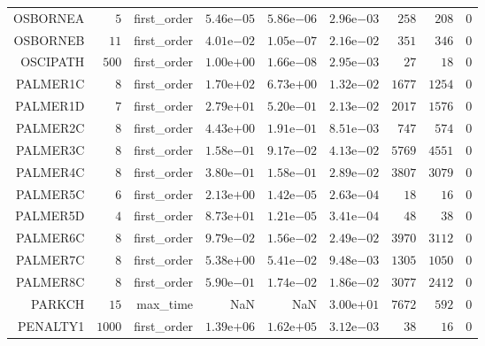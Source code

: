 \begin{longtable}{rrrrrrrrr}
OSBORNEA & \(     5\) & first\_order & \( 5.46\)e\(-05\) & \( 5.86\)e\(-06\) & \( 2.96\)e\(-03\) & \(   258\) & \(   208\) & \(     0\) \\
OSBORNEB & \(    11\) & first\_order & \( 4.01\)e\(-02\) & \( 1.05\)e\(-07\) & \( 2.16\)e\(-02\) & \(   351\) & \(   346\) & \(     0\) \\
OSCIPATH & \(   500\) & first\_order & \( 1.00\)e\(+00\) & \( 1.66\)e\(-08\) & \( 2.95\)e\(-03\) & \(    27\) & \(    18\) & \(     0\) \\
PALMER1C & \(     8\) & first\_order & \( 1.70\)e\(+02\) & \( 6.73\)e\(+00\) & \( 1.32\)e\(-02\) & \(  1677\) & \(  1254\) & \(     0\) \\
PALMER1D & \(     7\) & first\_order & \( 2.79\)e\(+01\) & \( 5.20\)e\(-01\) & \( 2.13\)e\(-02\) & \(  2017\) & \(  1576\) & \(     0\) \\
PALMER2C & \(     8\) & first\_order & \( 4.43\)e\(+00\) & \( 1.91\)e\(-01\) & \( 8.51\)e\(-03\) & \(   747\) & \(   574\) & \(     0\) \\
PALMER3C & \(     8\) & first\_order & \( 1.58\)e\(-01\) & \( 9.17\)e\(-02\) & \( 4.13\)e\(-02\) & \(  5769\) & \(  4551\) & \(     0\) \\
PALMER4C & \(     8\) & first\_order & \( 3.80\)e\(-01\) & \( 1.58\)e\(-01\) & \( 2.89\)e\(-02\) & \(  3807\) & \(  3079\) & \(     0\) \\
PALMER5C & \(     6\) & first\_order & \( 2.13\)e\(+00\) & \( 1.42\)e\(-05\) & \( 2.63\)e\(-04\) & \(    18\) & \(    16\) & \(     0\) \\
PALMER5D & \(     4\) & first\_order & \( 8.73\)e\(+01\) & \( 1.21\)e\(-05\) & \( 3.41\)e\(-04\) & \(    48\) & \(    38\) & \(     0\) \\
PALMER6C & \(     8\) & first\_order & \( 9.79\)e\(-02\) & \( 1.56\)e\(-02\) & \( 2.49\)e\(-02\) & \(  3970\) & \(  3112\) & \(     0\) \\
PALMER7C & \(     8\) & first\_order & \( 5.38\)e\(+00\) & \( 5.41\)e\(-02\) & \( 9.48\)e\(-03\) & \(  1305\) & \(  1050\) & \(     0\) \\
PALMER8C & \(     8\) & first\_order & \( 5.90\)e\(-01\) & \( 1.74\)e\(-02\) & \( 1.86\)e\(-02\) & \(  3077\) & \(  2412\) & \(     0\) \\
PARKCH & \(    15\) & max\_time &       NaN &       NaN & \( 3.00\)e\(+01\) & \(  7672\) & \(   592\) & \(     0\) \\
PENALTY1 & \(  1000\) & first\_order & \( 1.39\)e\(+06\) & \( 1.62\)e\(+05\) & \( 3.12\)e\(-03\) & \(    38\) & \(    16\) & \(     0\) \\

\end{longtable}
